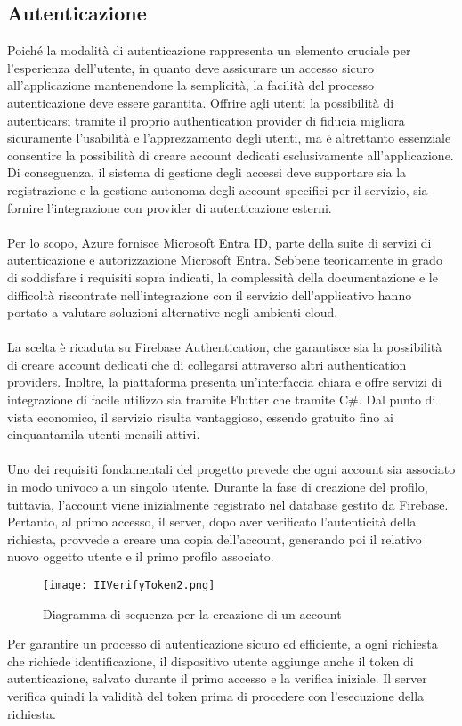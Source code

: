 



\subsection{Autenticazione}


Poiché la modalità di autenticazione rappresenta un elemento cruciale per l’esperienza dell’utente, 
in quanto deve assicurare un accesso sicuro all’applicazione mantenendone la semplicità, la facilità del processo autenticazione deve essere garantita.
Offrire agli utenti la possibilità di autenticarsi tramite il proprio authentication provider di fiducia migliora sicuramente l’usabilità e l’apprezzamento degli utenti, 
ma è altrettanto essenziale consentire la possibilità di creare account dedicati esclusivamente all’applicazione.
Di conseguenza, il sistema di gestione degli accessi deve supportare sia la registrazione e la gestione autonoma degli account specifici per il servizio, 
sia fornire l'integrazione con provider di autenticazione esterni.\\
\\
Per lo scopo, Azure fornisce Microsoft Entra ID, parte della suite di servizi di autenticazione e autorizzazione Microsoft Entra. 
Sebbene teoricamente in grado di soddisfare i requisiti sopra indicati, 
la complessità della documentazione e le difficoltà riscontrate nell’integrazione con il servizio dell’applicativo
 hanno portato a valutare soluzioni alternative negli ambienti cloud.\\
\\
La scelta è ricaduta su Firebase Authentication, che garantisce sia la possibilità di creare account dedicati che di collegarsi attraverso altri authentication providers. 
Inoltre, la piattaforma presenta un’interfaccia chiara e offre servizi di integrazione di facile utilizzo sia tramite Flutter che tramite C\#.
Dal punto di vista economico, il servizio risulta vantaggioso, essendo gratuito fino ai cinquantamila utenti mensili attivi.\\
\\
Uno dei requisiti fondamentali del progetto prevede che ogni account sia associato in modo univoco a un singolo utente. 
Durante la fase di creazione del profilo, tuttavia, l’account viene inizialmente registrato nel database gestito da Firebase. 
Pertanto, al primo accesso, il server, dopo aver verificato l’autenticità della richiesta, provvede a creare una copia dell’account, 
generando poi il relativo nuovo oggetto utente e il primo profilo associato.\\
\clearpage
\begin{figure}[h!]
    \centering
    \texttt{[image: IIVerifyToken2.png]}
    \caption{Diagramma di sequenza per la creazione di un account}
\end{figure}
Per garantire un processo di autenticazione sicuro ed efficiente, a ogni richiesta che richiede identificazione, 
il dispositivo utente aggiunge anche il token di autenticazione, salvato durante il primo accesso e la verifica iniziale. 
Il server verifica quindi la validità del token prima di procedere con l'esecuzione della richiesta.

